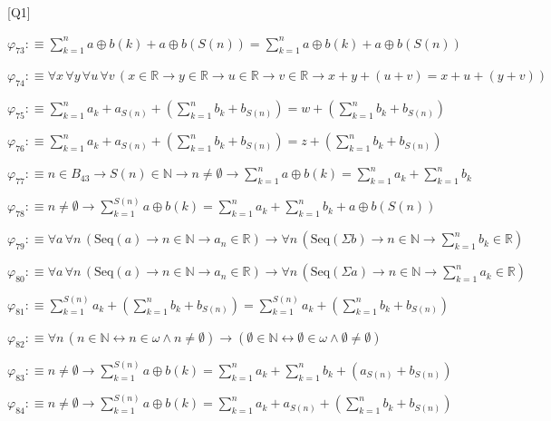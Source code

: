 \begin{fullproof}{[Q1]}
\begin{abbrevlist}
\item $\varphi_{73} :\equiv {\textstyle\sum_{k=1}^{n} a \oplus b(k)} + a \oplus b(S(n)) = {\textstyle\sum_{k=1}^{n} a \oplus b(k)} + a \oplus b(S(n))$
\item $\varphi_{74} :\equiv \forall x\,\forall y\,\forall u\,\forall v\,(x \in \mathbb{R} \to y \in \mathbb{R} \to u \in \mathbb{R} \to v \in \mathbb{R} \to x + y + (u + v) = x + u + (y + v))$
\item $\varphi_{75} :\equiv {\textstyle\sum_{k=1}^{n} a_{k}} + a_{S(n)} + ({\textstyle\sum_{k=1}^{n} b_{k}} + b_{S(n)}) = w + ({\textstyle\sum_{k=1}^{n} b_{k}} + b_{S(n)})$
\item $\varphi_{76} :\equiv {\textstyle\sum_{k=1}^{n} a_{k}} + a_{S(n)} + ({\textstyle\sum_{k=1}^{n} b_{k}} + b_{S(n)}) = z + ({\textstyle\sum_{k=1}^{n} b_{k}} + b_{S(n)})$
\item $\varphi_{77} :\equiv n \in B_{43} \to S(n) \in \mathbb{N} \to n \neq \emptyset \to {\textstyle\sum_{k=1}^{n} a \oplus b(k)} = {\textstyle\sum_{k=1}^{n} a_{k}} + {\textstyle\sum_{k=1}^{n} b_{k}}$
\item $\varphi_{78} :\equiv n \neq \emptyset \to {\textstyle\sum_{k=1}^{S(n)} a \oplus b(k)} = {\textstyle\sum_{k=1}^{n} a_{k}} + {\textstyle\sum_{k=1}^{n} b_{k}} + a \oplus b(S(n))$
\item $\varphi_{79} :\equiv \forall a\,\forall n\,(\mathrm{Seq}(a) \to n \in \mathbb{N} \to a_{n} \in \mathbb{R}) \to \forall n\,(\mathrm{Seq}(\Sigma b) \to n \in \mathbb{N} \to {\textstyle\sum_{k=1}^{n} b_{k}} \in \mathbb{R})$
\item $\varphi_{80} :\equiv \forall a\,\forall n\,(\mathrm{Seq}(a) \to n \in \mathbb{N} \to a_{n} \in \mathbb{R}) \to \forall n\,(\mathrm{Seq}(\Sigma a) \to n \in \mathbb{N} \to {\textstyle\sum_{k=1}^{n} a_{k}} \in \mathbb{R})$
\item $\varphi_{81} :\equiv {\textstyle\sum_{k=1}^{S(n)} a_{k}} + ({\textstyle\sum_{k=1}^{n} b_{k}} + b_{S(n)}) = {\textstyle\sum_{k=1}^{S(n)} a_{k}} + ({\textstyle\sum_{k=1}^{n} b_{k}} + b_{S(n)})$
\item $\varphi_{82} :\equiv \forall n\,(n \in \mathbb{N} \leftrightarrow n \in \omega \land n \neq \emptyset) \to (\emptyset \in \mathbb{N} \leftrightarrow \emptyset \in \omega \land \emptyset \neq \emptyset)$
\item $\varphi_{83} :\equiv n \neq \emptyset \to {\textstyle\sum_{k=1}^{S(n)} a \oplus b(k)} = {\textstyle\sum_{k=1}^{n} a_{k}} + {\textstyle\sum_{k=1}^{n} b_{k}} + (a_{S(n)} + b_{S(n)})$
\item $\varphi_{84} :\equiv n \neq \emptyset \to {\textstyle\sum_{k=1}^{S(n)} a \oplus b(k)} = {\textstyle\sum_{k=1}^{n} a_{k}} + a_{S(n)} + ({\textstyle\sum_{k=1}^{n} b_{k}} + b_{S(n)})$

\end{abbrevlist}
\end{fullproof}
